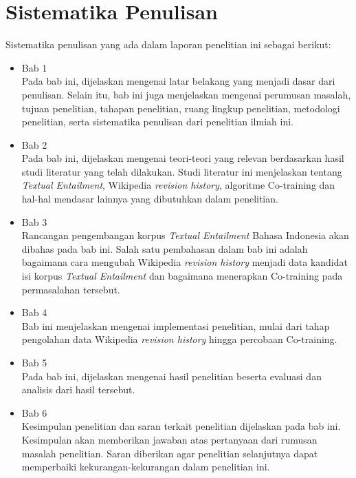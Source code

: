 \section{Sistematika Penulisan}
Sistematika penulisan yang ada dalam laporan penelitian ini sebagai berikut:
\begin{itemize}
	
	\item Bab 1 \babSatu \\
	Pada bab ini, dijelaskan mengenai latar belakang yang menjadi dasar dari penulisan. Selain itu, bab ini juga menjelaskan mengenai perumusan masalah, tujuan penelitian, tahapan penelitian, ruang lingkup penelitian, metodologi penelitian, serta sistematika penulisan dari penelitian ilmiah ini.
	
	\item Bab 2 \babDua \\
	Pada bab ini, dijelaskan mengenai teori-teori yang relevan berdasarkan hasil studi literatur yang telah dilakukan. Studi literatur ini menjelaskan tentang \textit{Textual Entailment}, Wikipedia \textit{revision history}, algoritme Co-training dan hal-hal mendasar lainnya yang dibutuhkan dalam penelitian.
	
	\item Bab 3 \babTiga \\
	Rancangan pengembangan korpus \textit{Textual Entailment} Bahasa Indonesia akan dibahas pada bab ini. Salah satu pembahasan dalam bab ini adalah bagaimana cara mengubah Wikipedia \textit{revision history} menjadi data kandidat isi korpus \textit{Textual Entailment} dan bagaimana menerapkan Co-training pada permasalahan tersebut.
	
	\item Bab 4 \babEmpat \\
	Bab ini menjelaskan mengenai implementasi penelitian, mulai dari tahap pengolahan data Wikipedia \textit{revision history} hingga percobaan Co-training.
	
	\item Bab 5 \babLima \\
	Pada bab ini, dijelaskan mengenai hasil penelitian beserta evaluasi dan analisis dari hasil tersebut. 
	
	\item Bab 6 \babEnam \\
	Kesimpulan penelitian dan saran terkait penelitian dijelaskan pada bab ini. Kesimpulan akan memberikan jawaban atas pertanyaan dari rumusan masalah penelitian. Saran diberikan agar penelitian selanjutnya dapat memperbaiki kekurangan-kekurangan dalam penelitian ini.
	
\end{itemize}